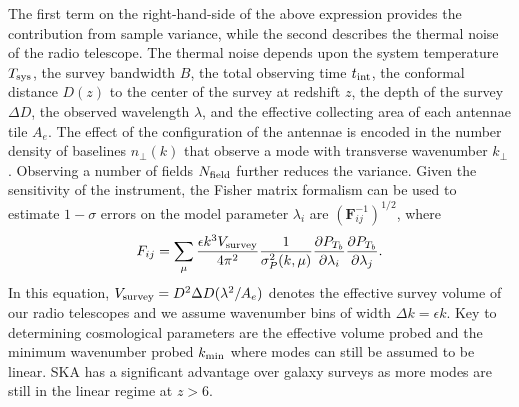 \documentclass{PoS}
\begin{document}
The first term on the right-hand-side
of the above expression provides the contribution from sample variance,
while the second describes the thermal noise of the radio telescope.  The
thermal noise depends upon the system temperature $T_{\rm sys}$, the survey
bandwidth $B$, the total observing time $t_{\rm int}$, the conformal
distance $D(z)$ to the center of the survey at redshift $z$, the depth of
the survey $\Delta D$, the observed wavelength $\lambda$, and the effective
collecting area of each antennae tile $A_e$.  The effect of the
configuration of the antennae is encoded in the number density of baselines
$n_\perp(k)$ that observe a mode with transverse wavenumber $k_\perp$
\citep{2006ApJ...653..815M}.  Observing a number of fields $N_{\rm field}$ further reduces the variance. Given the sensitivity of the instrument, the Fisher matrix formalism can be used to estimate $1-\sigma$ errors on the model parameter $\lambda_i$ are $(\mathbf{F}_{ij}^{-1})^{1/2}$, where 
\begin{equation}
F_{ij}=\sum_{\rm \mu} \frac{\epsilon k^3 V_{\rm survey}}{4\pi^2}\frac{1}{\sigma_P^2(k,\mu)}\frac{\partial P_{T_b}}{\partial \lambda_i}\frac{\partial P_{T_b}}{\partial \lambda_j}.
\end{equation}
In this equation, $V_{\rm survey}=D^2\Delta D(\lambda^2/A_e)$ denotes the
effective survey volume of our radio telescopes and we assume wavenumber
bins of width $\Delta k=\epsilon k$.  Key to determining cosmological parameters are the effective volume probed and the minimum wavenumber probed $k_{\rm min}$ where modes can still be assumed to be linear. SKA has a significant advantage over galaxy surveys as more modes are still in the linear regime at $z>6$. 
\end{document}
